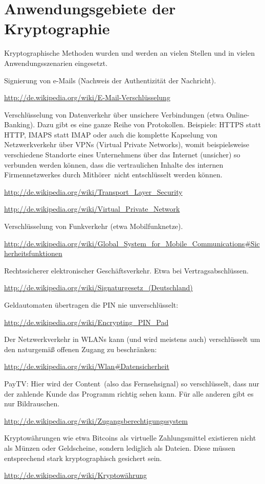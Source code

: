\section{Anwendungsgebiete der Kryptographie}

Kryptographische Methoden wurden und werden an vielen Stellen und in vielen
Anwendungsszenarien eingesetzt.

\begin{compactitem}
\item Signierung von e-Mails (Nachweis der Authentizität der Nachricht).	

\url{http://de.wikipedia.org/wiki/E-Mail-Verschlüsselung}
\item Verschlüsselung von Datenverkehr über unsichere Verbindungen (etwa
Online-Banking). Dazu gibt es eine ganze Reihe von Protokollen. Beispiele:
HTTPS statt HTTP, IMAPS statt IMAP oder auch die komplette Kapselung von
Netzwerkverkehr über VPNs (Virtual Private Networks), womit beispielsweise
verschiedene Standorte eines Unternehmens über das Internet (unsicher) so
verbunden werden können, dass die vertraulichen Inhalte des internen
Firmennetzwerkes durch \glqq Mithörer\grqq\ nicht entschlüsselt werden können.

\url{http://de.wikipedia.org/wiki/Transport_Layer_Security}

\url{http://de.wikipedia.org/wiki/Virtual_Private_Network}

\item Verschlüsselung von Funkverkehr (etwa Mobilfunknetze).	 

\url{http://de.wikipedia.org/wiki/Global_System_for_Mobile_Communications#Sicherheitsfunktionen}
\item Rechtssicherer elektronischer Geschäftsverkehr. Etwa bei
Vertragsabschlüssen.

\url{http://de.wikipedia.org/wiki/Signaturgesetz_(Deutschland)}
\item Geldautomaten übertragen die PIN nie unverschlüsselt:	

\url{http://de.wikipedia.org/wiki/Encrypting_PIN_Pad}
\item Der Netzwerkverkehr in WLANs kann (und wird meistens auch) verschlüsselt
um den naturgemäß offenen Zugang zu beschränken:

\url{http://de.wikipedia.org/wiki/Wlan#Datensicherheit}
\item PayTV: Hier wird der \glqq Content\grqq\ (also das Fernsehsignal) so
verschlüsselt, dass nur der zahlende Kunde das Programm richtig sehen kann. Für
alle anderen gibt es nur Bildrauschen.

\url{http://de.wikipedia.org/wiki/Zugangsberechtigungssystem}
\item Kryptowährungen wie etwa Bitcoins als virtuelle Zahlungsmittel existieren
nicht als Münzen oder Geldscheine, sondern lediglich als Dateien. Diese müssen
entsprechend stark kryptographisch gesichert sein.

\url{http://de.wikipedia.org/wiki/Kryptowährung}
\end{compactitem}


